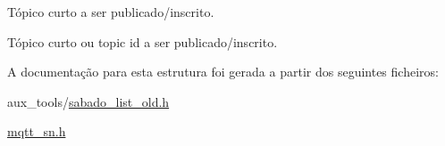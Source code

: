 Tópico curto a ser publicado/inscrito. 

Tópico curto ou topic id a ser publicado/inscrito. 

A documentação para esta estrutura foi gerada a partir dos seguintes ficheiros\+:\begin{DoxyCompactItemize}
\item 
aux\+\_\+tools/\hyperlink{sabado__list__old_8h}{sabado\+\_\+list\+\_\+old.\+h}\item 
\hyperlink{mqtt__sn_8h}{mqtt\+\_\+sn.\+h}\end{DoxyCompactItemize}
